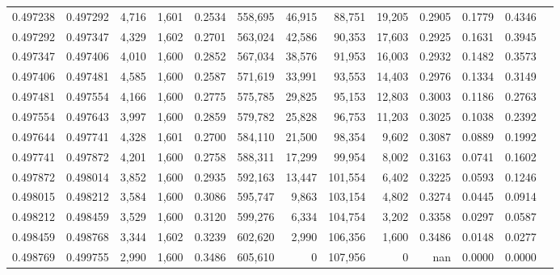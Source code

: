 \begin{tabular}{rrrrrrrrrrrrr}
0.497238 & 0.497292 &  4,716 & 1,601 &                                     0.2534 & 558,695 &  46,915 &  88,751 &  19,205 & 0.2905 & 0.1779 & 0.4346 \\
0.497292 & 0.497347 &  4,329 & 1,602 &                                     0.2701 & 563,024 &  42,586 &  90,353 &  17,603 & 0.2925 & 0.1631 & 0.3945 \\
0.497347 & 0.497406 &  4,010 & 1,600 &                                     0.2852 & 567,034 &  38,576 &  91,953 &  16,003 & 0.2932 & 0.1482 & 0.3573 \\
0.497406 & 0.497481 &  4,585 & 1,600 &                                     0.2587 & 571,619 &  33,991 &  93,553 &  14,403 & 0.2976 & 0.1334 & 0.3149 \\
0.497481 & 0.497554 &  4,166 & 1,600 &                                     0.2775 & 575,785 &  29,825 &  95,153 &  12,803 & 0.3003 & 0.1186 & 0.2763 \\
0.497554 & 0.497643 &  3,997 & 1,600 &                                     0.2859 & 579,782 &  25,828 &  96,753 &  11,203 & 0.3025 & 0.1038 & 0.2392 \\
0.497644 & 0.497741 &  4,328 & 1,601 &                                     0.2700 & 584,110 &  21,500 &  98,354 &   9,602 & 0.3087 & 0.0889 & 0.1992 \\
0.497741 & 0.497872 &  4,201 & 1,600 &                                     0.2758 & 588,311 &  17,299 &  99,954 &   8,002 & 0.3163 & 0.0741 & 0.1602 \\
0.497872 & 0.498014 &  3,852 & 1,600 &                                     0.2935 & 592,163 &  13,447 & 101,554 &   6,402 & 0.3225 & 0.0593 & 0.1246 \\
0.498015 & 0.498212 &  3,584 & 1,600 &                                     0.3086 & 595,747 &   9,863 & 103,154 &   4,802 & 0.3274 & 0.0445 & 0.0914 \\
0.498212 & 0.498459 &  3,529 & 1,600 &                                     0.3120 & 599,276 &   6,334 & 104,754 &   3,202 & 0.3358 & 0.0297 & 0.0587 \\
0.498459 & 0.498768 &  3,344 & 1,602 &                                     0.3239 & 602,620 &   2,990 & 106,356 &   1,600 & 0.3486 & 0.0148 & 0.0277 \\
0.498769 & 0.499755 &  2,990 & 1,600 &                                     0.3486 & 605,610 &       0 & 107,956 &       0 &    nan & 0.0000 & 0.0000 \\
\bottomrule
\end{tabular}
